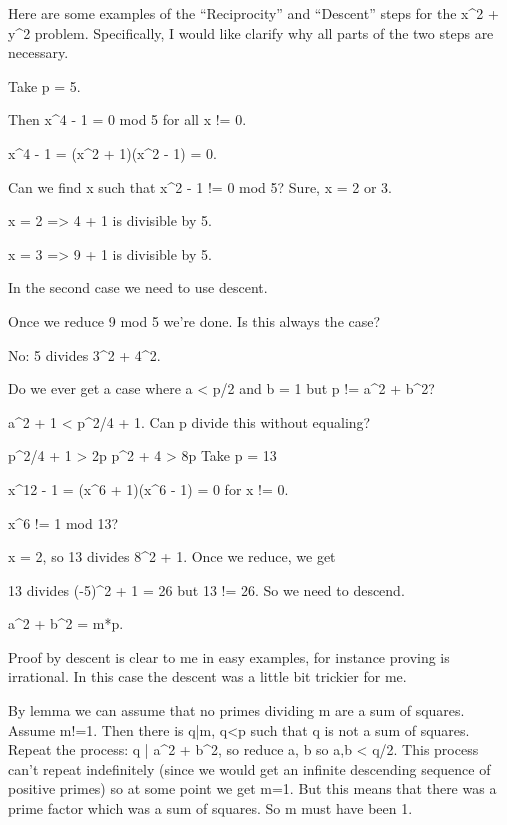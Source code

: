 Here are some examples of the ``Reciprocity'' and ``Descent'' steps for the x^2 + y^2 problem. Specifically, I would like clarify why all parts of the two steps are necessary.

Take p = 5.

Then x^4 - 1 = 0 mod 5 for all x != 0.

x^4 - 1 = (x^2 + 1)(x^2 - 1) = 0.

Can we find x such that x^2 - 1 != 0 mod 5? Sure, x = 2 or 3.

x = 2 => 4 + 1 is divisible by 5.

x = 3 => 9 + 1 is divisible by 5.

In the second case we need to use descent.

Once we reduce 9 mod 5 we're done. Is this always the case?

No: 5 divides 3^2 + 4^2.

Do we ever get a case where a < p/2 and b = 1 but p != a^2 + b^2?

a^2 + 1 < p^2/4 + 1. Can p divide this without equaling?

p^2/4 + 1 > 2p
p^2 + 4 > 8p
Take p = 13

x^12 - 1 = (x^6 + 1)(x^6 - 1) = 0 for x != 0.

x^6 != 1 mod 13?

x = 2, so 13 divides 8^2 + 1. Once we reduce, we get

13 divides (-5)^2 + 1 = 26 but 13 != 26. So we need to descend.

a^2 + b^2 = m*p.

Proof by descent is clear to me in easy examples, for instance proving  is irrational. In this case the descent was a little bit trickier for me.

By lemma we can assume that no primes dividing m are a sum of squares. Assume m!=1. Then there is q|m, q<p such that q is not a sum of squares. Repeat the process: q | a^2 + b^2, so reduce a, b so a,b < q/2. This process can't repeat indefinitely (since we would get an infinite descending sequence of positive primes) so at some point we get m=1. But this means that there was a prime factor which was a sum of squares. So m must have been 1.
